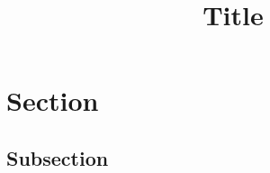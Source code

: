 \documentclass[a4paper]{article}
\title{Title}
\begin{document}
\maketitle

\tableofcontents
\newpage

\abstract

\lipsum[1]

\section{Section}

\lipsum[2-3]

\subsection{Subsection}

\lipsum[1]




% 

%

\end{document}
